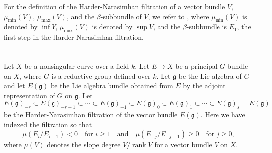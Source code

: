 \documentclass[12pt]{article}
\begin{document}
For the definition of the Harder-Narasimhan filtration of a vector bundle $V$, $\mu_{\min}(V)$, $\mu_{\max}(V)$, and the $\beta$-subbundle of $V$, we refer to \cite[pages 588--589]{atiyah-bott}, where $\mu_{\min}(V)$ is denoted by $\inf V$, $\mu_{\max}(V)$ is denoted by $\sup V$, and the $\beta$-subbundle is $E_1$, the first step in the Harder-Narasimhan filtration.

\section{}

Let $X$ be a nonsingular curve over a field $k$. Let $E \to X$ be a principal $G$-bundle on $X$, where $G$ is a reductive group defined over $k$. Let $\mathfrak{g}$ be the Lie algebra of $G$ and let $E(\mathfrak{g})$ be the Lie algebra bundle obtained from $E$ by the adjoint representation of $G$ on $\mathfrak{g}$. Let
\begin{equation}\label{star}\tag{$*$}
E(\mathfrak{g})_{-r} \subset E(\mathfrak{g})_{-r+1} \subset \cdots \subset E(\mathfrak{g})_{-1} \subset E(\mathfrak{g})_0 \subset E(\mathfrak{g})_1 \subset \cdots \subset E(\mathfrak{g})_s = E(\mathfrak{g})
\end{equation}
be the Harder-Narasimhan filtration of the vector bundle $E(\mathfrak{g})$. Here we have indexed the filtration so that
\[
\mu(E_i / E_{i-1}) < 0 \quad \text{for } i \geq 1 \quad \text{and} \quad \mu(E_{-j} / E_{-j-1}) \geq 0 \quad \text{for } j \geq 0,
\]
where $\mu(V)$ denotes the slope degree $V / \operatorname{rank} V$ for a vector bundle $V$ on $X$.
\end{document}
